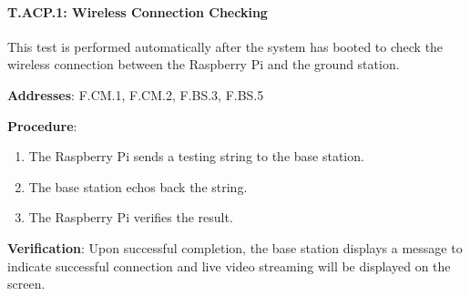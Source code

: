 \paragraph{T.ACP.1: Wireless Connection Checking}

This test is performed automatically after the system has booted to check the wireless connection between the Raspberry Pi and the ground station.

\textbf{Addresses}: F.CM.1, F.CM.2, F.BS.3, F.BS.5

\textbf{Procedure}:
\begin{enumerate}[noitemsep]
    \item The Raspberry Pi sends a testing string to the base station.
    \item The base station echos back the string.
    \item The Raspberry Pi verifies the result.
\end{enumerate}

\textbf{Verification}: 
Upon successful completion, the base station displays a message to indicate successful connection and live video streaming will be displayed on the screen.